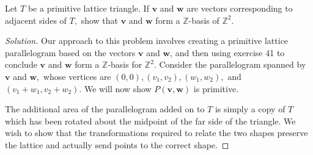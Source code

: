 \documentclass[12pt]{article}
\newcommand{\Z}{\mathbb{Z}}
\newenvironment{exercise}[2][Exercise]{\begin{trivlist}
        \item[\hskip \labelsep {\bfseries #1}\hskip \labelsep {\bfseries #2.}]}{\end{trivlist}}
\newenvironment{solution}
        {\begin{proof}[Solution]}
                    {\end{proof}}
\begin{document}
\begin{exercise}{42}
    Let \( T \) be a primitive lattice triangle. If \( \mathbf{v} \) and \( \mathbf{w} \) are vectors corresponding to adjacent sides of \( T , \) show that \( \mathbf{v} \) and \( \mathbf{w} \) form a \( \Z \)-basis of \( \Z^{2} . \)
    \begin{solution}
        Our approach to this problem involves creating a primitive lattice parallelogram based on the vectors \( \mathbf{v} \) and \( \mathbf{w}  \), and then using exercise 41 to conclude \( \mathbf{v} \) and \( \mathbf{w} \) form a \( \mathbb{Z} \)-basis for \( \mathbb{Z}^{2} . \) Consider the parallelogram spanned by \( \mathbf{v} \) and \( \mathbf{w} , \) whose vertices are \( (0,0) , (v_{1} , v_{2}) , (w_{1} , w_{2}) , \) and \( (v_{1} + w_{1} , v_{2} + w_{2}) . \) We will now show \( P(\mathbf{v} , \mathbf{w}) \) is primitive.

        The additional area of the parallelogram added on to \( T \) is simply a copy of \( T \) which has been rotated about the midpoint of the far side of the triangle. We wish to show that the transformations required to relate the two shapes preserve the lattice and actually send points to the correct shape.


\end{solution}
\end{exercise}
\end{document}

